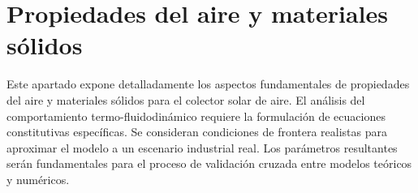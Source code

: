 \section{Propiedades del aire y materiales sólidos}
\label{sec:cap07_propiedades}

Este apartado expone detalladamente los aspectos fundamentales de propiedades del aire y materiales sólidos para el colector solar de aire.
El análisis del comportamiento termo-fluidodinámico requiere la formulación de ecuaciones constitutivas específicas.
Se consideran condiciones de frontera realistas para aproximar el modelo a un escenario industrial real.
Los parámetros resultantes serán fundamentales para el proceso de validación cruzada entre modelos teóricos y numéricos.
